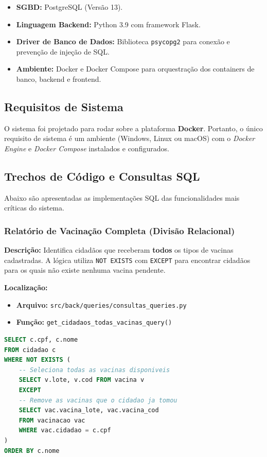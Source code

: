 \documentclass[12pt, a4paper]{article}
\begin{document}
\begin{itemize}
    \item \textbf{SGBD:} PostgreSQL (Versão 13).
    \item \textbf{Linguagem Backend:} Python 3.9 com framework Flask.
    \item \textbf{Driver de Banco de Dados:} Biblioteca \texttt{psycopg2} para conexão e prevenção de injeção de SQL.
    \item \textbf{Ambiente:} Docker e Docker Compose para orquestração dos containers de banco, backend e frontend.
\end{itemize}

\subsection{Requisitos de Sistema}
O sistema foi projetado para rodar sobre a plataforma \textbf{Docker}. Portanto, o único requisito de sistema é um ambiente (Windows, Linux ou macOS) com o \textit{Docker Engine} e \textit{Docker Compose} instalados e configurados.

\subsection{Trechos de Código e Consultas SQL}
Abaixo são apresentadas as implementações SQL das funcionalidades mais críticas do sistema.

\subsubsection{Relatório de Vacinação Completa (Divisão Relacional)}
\textbf{Descrição:} Identifica cidadãos que receberam \textbf{todos} os tipos de vacinas cadastradas. A lógica utiliza \texttt{NOT EXISTS} com \texttt{EXCEPT} para encontrar cidadãos para os quais não existe nenhuma vacina pendente.

\noindent\textbf{Localização:}
\begin{itemize}
    \item \textbf{Arquivo:} \texttt{src/back/queries/consultas\_queries.py}
    \item \textbf{Função:} \texttt{get\_cidadaos\_todas\_vacinas\_query()}
\end{itemize}

\begin{lstlisting}[language=SQL, caption=Divisão Relacional: Cidadãos com todas as vacinas]
SELECT c.cpf, c.nome
FROM cidadao c
WHERE NOT EXISTS (
    -- Seleciona todas as vacinas disponiveis
    SELECT v.lote, v.cod FROM vacina v
    EXCEPT
    -- Remove as vacinas que o cidadao ja tomou
    SELECT vac.vacina_lote, vac.vacina_cod
    FROM vacinacao vac
    WHERE vac.cidadao = c.cpf
)
ORDER BY c.nome
\end{lstlisting}
\end{document}
